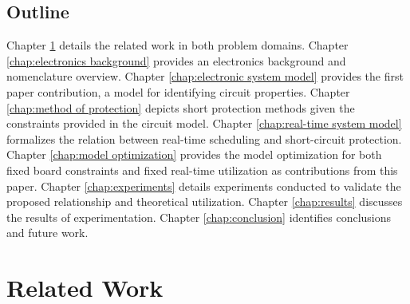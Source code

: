 \documentclass[11pt,oneside]{report}
\begin{document}
    
    \section*{Outline}
    Chapter \ref{chap:related work} details the related work in both problem domains.
    Chapter \ref{chap:electronics background} provides an electronics background and nomenclature overview.
    Chapter \ref{chap:electronic system model} provides the first paper contribution, a model for identifying circuit properties.
    Chapter \ref{chap:method of protection} depicts short protection methods given the constraints provided in the circuit model.
    Chapter \ref{chap:real-time system model} formalizes the relation between real-time scheduling and short-circuit protection.
    Chapter \ref{chap:model optimization} provides the model optimization for both fixed board constraints and fixed real-time utilization as contributions from this paper.
    Chapter \ref{chap:experiments} details experiments conducted to validate the proposed relationship and theoretical utilization.
    Chapter \ref{chap:results} discusses the results of experimentation.
    Chapter \ref{chap:conclusion} identifies conclusions and future work.
    
    
    
    
    \chapter{Related Work}  \label{chap:related work}
    
\end{document}
